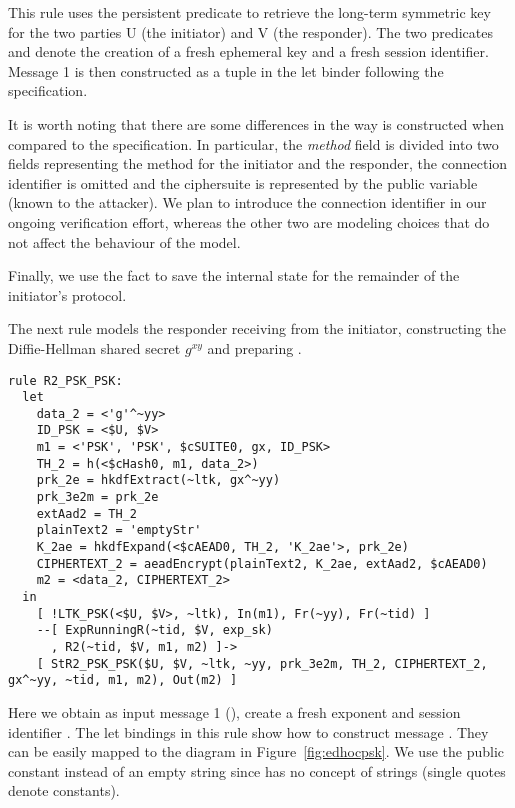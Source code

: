 This rule uses the persistent predicate  to retrieve the long-term
symmetric key for the two parties U (the initiator) and V (the responder).  The
two predicates  and  denote the creation of a fresh
ephemeral key and a fresh session identifier.  Message 1 is then constructed as
a tuple in the let binder following the specification.

It is worth noting that there are some differences in the way  is
constructed when compared to the specification. In particular, the \emph{method}
field is divided into two fields representing the method for the initiator and
the responder, the connection identifier is omitted and the ciphersuite is
represented by the public variable
 (known to the attacker). We plan to introduce the connection
identifier \mCi in our ongoing verification effort, whereas the other two are
modeling choices that do not affect the behaviour of the model.

Finally, we use the fact  %
to save the internal state for the remainder of the initiator's protocol.

The next rule models the responder receiving  from the initiator,
constructing the Diffie-Hellman shared secret $g^{xy}$ and preparing .
\begin{lstlisting}
rule R2_PSK_PSK:
  let
    data_2 = <'g'^~yy>
    ID_PSK = <$U, $V>
    m1 = <'PSK', 'PSK', $cSUITE0, gx, ID_PSK>
    TH_2 = h(<$cHash0, m1, data_2>)
    prk_2e = hkdfExtract(~ltk, gx^~yy)
    prk_3e2m = prk_2e
    extAad2 = TH_2
    plainText2 = 'emptyStr'
    K_2ae = hkdfExpand(<$cAEAD0, TH_2, 'K_2ae'>, prk_2e)
    CIPHERTEXT_2 = aeadEncrypt(plainText2, K_2ae, extAad2, $cAEAD0)
    m2 = <data_2, CIPHERTEXT_2>
  in
    [ !LTK_PSK(<$U, $V>, ~ltk), In(m1), Fr(~yy), Fr(~tid) ]
    --[ ExpRunningR(~tid, $V, exp_sk)
      , R2(~tid, $V, m1, m2) ]->
    [ StR2_PSK_PSK($U, $V, ~ltk, ~yy, prk_3e2m, TH_2, CIPHERTEXT_2, gx^~yy, ~tid, m1, m2), Out(m2) ]
\end{lstlisting}

Here we obtain as input message 1 (), create a fresh exponent  and
session identifier .  The let bindings in this rule show how to
construct message .  They can be easily mapped to the diagram in
Figure~\ref{fig:edhocpsk}.  We use the public constant \mbox{} instead
of an empty string since \mTamarin{} has no concept of strings (single quotes
denote constants).

